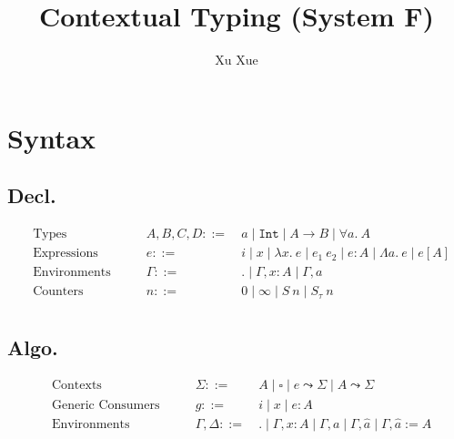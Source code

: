 \documentclass{article}
\title{Contextual Typing (System F)}
\author{Xu Xue}
\begin{document}
\maketitle

\section{Syntax}

\subsection{Decl.}

\begin{align*}
&\text{Types} \quad\quad &A, B, C, D ::=&~ a \mid \mathtt{Int} \mid A \rightarrow B \mid \forall a.~A\\
&\text{Expressions} \quad \quad &e::=&~ i \mid x \mid \lambda x . ~e \mid e_1~e_2 \mid e : A \mid \Lambda a.~e \mid e[A]\\
&\text{Environments} \quad\quad &\Gamma::=&~ . \mid \Gamma, x : A \mid \Gamma, a\\
&\text{Counters} \quad\quad &n ::=&~ 0 \mid \infty \mid S~n \mid S_{\tau}~n\\
\end{align*}

\subsection{Algo.}

\begin{align*}
    &\text{Contexts} \quad\quad &\Sigma ::=&~ A \mid \square \mid \boxed{e} \leadsto \Sigma \mid \boxed{A} \leadsto \Sigma\\
    &\text{Generic Consumers} \quad \quad &g::=&~ i \mid x \mid e : A\\
    &\text{Environments} \quad\quad &\Gamma,\Delta::=&~ . \mid \Gamma, x : A \mid \Gamma, a \mid \Gamma, \hat{a} \mid \Gamma, \hat{a}:=A\\
\end{align*}

%
\end{document}
